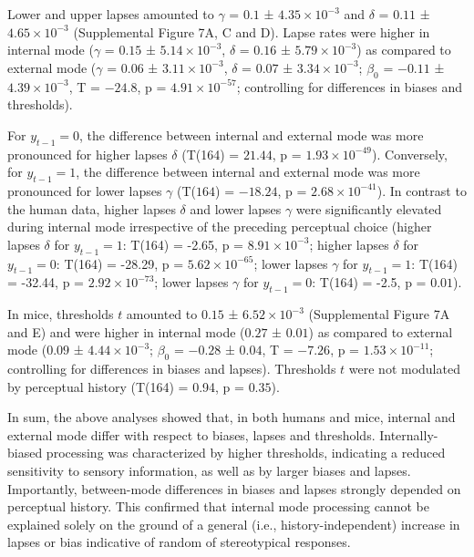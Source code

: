 \documentclass[
]{article}
\begin{document}
Lower and upper lapses amounted to \(\gamma\) = \(0.1\) ±
\(\ensuremath{4.35\times 10^{-3}}\) and \(\delta\) = \(0.11\) ±
\(\ensuremath{4.65\times 10^{-3}}\) (Supplemental Figure 7A, C and D).
Lapse rates were higher in internal mode (\(\gamma\) = \(0.15\) ±
\(\ensuremath{5.14\times 10^{-3}}\), \(\delta\) = \(0.16\) ±
\(\ensuremath{5.79\times 10^{-3}}\)) as compared to external mode
(\(\gamma\) = \(0.06\) ± \(\ensuremath{3.11\times 10^{-3}}\), \(\delta\)
= \(0.07\) ± \(\ensuremath{3.34\times 10^{-3}}\); \(\beta_0\) =
\(-0.11\) ± \(\ensuremath{4.39\times 10^{-3}}\), T = \(-24.8\), p =
\(\ensuremath{4.91\times 10^{-57}}\); controlling for differences in
biases and thresholds).

For \(y_{t-1} = 0\), the difference between internal and external mode
was more pronounced for higher lapses \(\delta\) (T(164) = \(21.44\), p
= \(\ensuremath{1.93\times 10^{-49}}\)). Conversely, for
\(y_{t-1} = 1\), the difference between internal and external mode was
more pronounced for lower lapses \(\gamma\) (T(\(164\)) = \(-18.24\), p
= \(\ensuremath{2.68\times 10^{-41}}\)). In contrast to the human data,
higher lapses \(\delta\) and lower lapses \(\gamma\) were significantly
elevated during internal mode irrespective of the preceding perceptual
choice (higher lapses \(\delta\) for \(y_{t-1} = 1\): T(164) = -2.65, p
= \(\ensuremath{8.91\times 10^{-3}}\); higher lapses \(\delta\) for
\(y_{t-1} = 0\): T(164) = -28.29, p =
\(\ensuremath{5.62\times 10^{-65}}\); lower lapses \(\gamma\) for
\(y_{t-1} = 1\): T(164) = -32.44, p =
\(\ensuremath{2.92\times 10^{-73}}\); lower lapses \(\gamma\) for
\(y_{t-1} = 0\): T(164) = -2.5, p = \(0.01\)).

In mice, thresholds \(t\) amounted to \(0.15\) ±
\(\ensuremath{6.52\times 10^{-3}}\) (Supplemental Figure 7A and E) and
were higher in internal mode (\(0.27\) ± \(0.01\)) as compared to
external mode (\(0.09\) ± \(\ensuremath{4.44\times 10^{-3}}\);
\(\beta_0\) = \(-0.28\) ± \(0.04\), T = \(-7.26\), p =
\(\ensuremath{1.53\times 10^{-11}}\); controlling for differences in
biases and lapses). Thresholds \(t\) were not modulated by perceptual
history (T(164) = 0.94, p = \(0.35\)).

In sum, the above analyses showed that, in both humans and mice,
internal and external mode differ with respect to biases, lapses and
thresholds. Internally-biased processing was characterized by higher
thresholds, indicating a reduced sensitivity to sensory information, as
well as by larger biases and lapses. Importantly, between-mode
differences in biases and lapses strongly depended on perceptual
history. This confirmed that internal mode processing cannot be
explained solely on the ground of a general (i.e., history-independent)
increase in lapses or bias indicative of random of stereotypical
responses.
\end{document}

